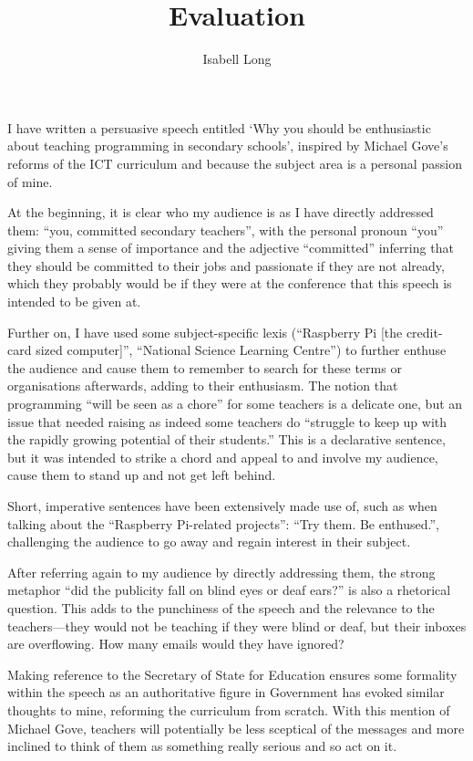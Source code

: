\documentclass[11pt,a4paper]{article}
\begin{document}
\title{Evaluation}
\author{Isabell Long}
\maketitle

I have written a persuasive speech entitled `Why you should be enthusiastic about teaching programming in secondary schools', inspired by Michael Gove's reforms of the ICT curriculum and because the subject area is a personal passion of mine.

At the beginning, it is clear who my audience is as I have directly addressed them: ``you, committed secondary teachers'', with the personal pronoun ``you'' giving them a sense of importance and the adjective ``committed'' inferring that they should be committed to their jobs and passionate if they are not already, which they probably would be if they were at the conference that this speech is intended to be given at.

Further on, I have used some subject-specific lexis (``Raspberry Pi [the credit-card sized computer]'', ``National Science Learning Centre'') to further enthuse the audience and cause them to remember to search for these terms or organisations afterwards, adding to their enthusiasm. The notion that programming ``will be seen as a chore'' for some teachers is a delicate one, but an issue that needed raising as indeed some teachers do ``struggle to keep up with the rapidly growing potential of their students.'' This is a declarative sentence, but it was intended to strike a chord and appeal to and involve my audience, cause them to stand up and not get left behind.

Short, imperative sentences have been extensively made use of, such as when talking about the ``Raspberry Pi-related projects'': ``Try them. Be enthused.'', challenging the audience to go away and regain interest in their subject.

After referring again to my audience by directly addressing them, the strong metaphor ``did the publicity fall on blind eyes or deaf ears?'' is also a rhetorical question. This adds to the punchiness of the speech and the relevance to the teachers---they would not be teaching if they were blind or deaf, but their inboxes are overflowing. How many emails would they have ignored?

Making reference to the Secretary of State for Education ensures some formality within the speech as an authoritative figure in Government has evoked similar thoughts to mine, reforming the curriculum from scratch. With this mention of Michael Gove, teachers will potentially be less sceptical of the messages and more inclined to think of them as something really serious and so act on it.
\end{document}
